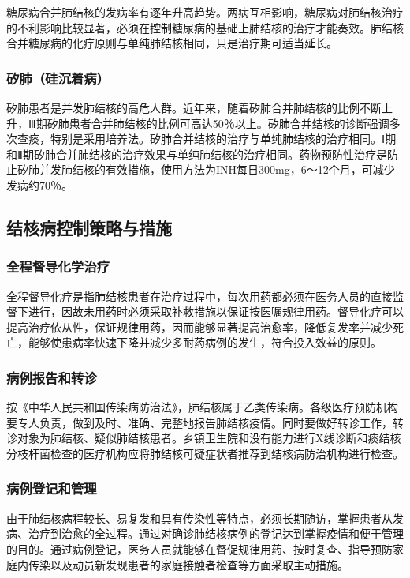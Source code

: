 糖尿病合并肺结核的发病率有逐年升高趋势。两病互相影响，糖尿病对肺结核治疗的不利影响比较显著，必须在控制糖尿病的基础上肺结核的治疗才能奏效。肺结核合并糖尿病的化疗原则与单纯肺结核相同，只是治疗期可适当延长。

\subsubsection{矽肺（硅沉着病）}

矽肺患者是并发肺结核的高危人群。近年来，随着矽肺合并肺结核的比例不断上升，Ⅲ期矽肺患者合并肺结核的比例可高达50％以上。矽肺合并结核的诊断强调多次查痰，特别是采用培养法。矽肺合并结核的治疗与单纯肺结核的治疗相同。Ⅰ期和Ⅱ期矽肺合并肺结核的治疗效果与单纯肺结核的治疗相同。药物预防性治疗是防止矽肺并发肺结核的有效措施，使用方法为INH每日300mg，6～12个月，可减少发病约70％。

\subsection{结核病控制策略与措施}

\subsubsection{全程督导化学治疗}

全程督导化疗是指肺结核患者在治疗过程中，每次用药都必须在医务人员的直接监督下进行，因故未用药时必须采取补救措施以保证按医嘱规律用药。督导化疗可以提高治疗依从性，保证规律用药，因而能够显著提高治愈率，降低复发率并减少死亡，能够使患病率快速下降并减少多耐药病例的发生，符合投入效益的原则。

\subsubsection{病例报告和转诊}

按《中华人民共和国传染病防治法》，肺结核属于乙类传染病。各级医疗预防机构要专人负责，做到及时、准确、完整地报告肺结核疫情。同时要做好转诊工作，转诊对象为肺结核、疑似肺结核患者。乡镇卫生院和没有能力进行X线诊断和痰结核分枝杆菌检查的医疗机构应将肺结核可疑症状者推荐到结核病防治机构进行检查。

\subsubsection{病例登记和管理}

由于肺结核病程较长、易复发和具有传染性等特点，必须长期随访，掌握患者从发病、治疗到治愈的全过程。通过对确诊肺结核病例的登记达到掌握疫情和便于管理的目的。通过病例登记，医务人员就能够在督促规律用药、按时复查、指导预防家庭内传染以及动员新发现患者的家庭接触者检查等方面采取主动措施。

